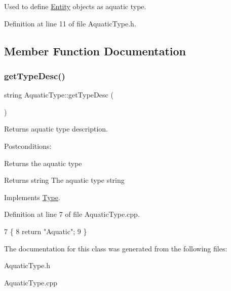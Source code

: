 Used to define \hyperlink{classEntity}{Entity} objects as aquatic type. 

Definition at line 11 of file Aquatic\+Type.\+h.



\subsection{Member Function Documentation}
\mbox{\label{classAquaticType_abb1b9ebdb96a352e0287f7a7cb803eab}} 
\subsubsection{\texorpdfstring{get\+Type\+Desc()}{getTypeDesc()}}
{\footnotesize\ttfamily string Aquatic\+Type\+::get\+Type\+Desc (\begin{DoxyParamCaption}{ }\end{DoxyParamCaption})\hspace{0.3cm}{\ttfamily [virtual]}}



Returns aquatic type description. 

Postconditions\+:
\begin{DoxyItemize}
\item Returns the aquatic type
\end{DoxyItemize}

\begin{DoxyReturn}{Returns}
string The aquatic type string 
\end{DoxyReturn}


Implements \hyperlink{classType}{Type}.



Definition at line 7 of file Aquatic\+Type.\+cpp.


\begin{DoxyCode}
7                                 \{
8     \textcolor{keywordflow}{return} \textcolor{stringliteral}{"Aquatic"};
9 \}
\end{DoxyCode}


The documentation for this class was generated from the following files\+:\begin{DoxyCompactItemize}
\item 
Aquatic\+Type.\+h\item 
Aquatic\+Type.\+cpp\end{DoxyCompactItemize}

